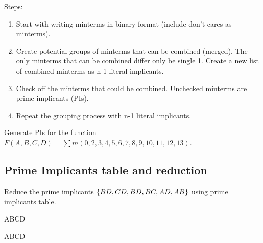 Steps:
\begin{enumerate}
  \item Start with writing minterms in binary format (include don't cares as minterms).
  \item Create potential groups of minterms that can be combined (merged). The only
    minterms that can be combined differ only be single 1. Create a new list of
    combined minterms as n-1 literal implicants.
  \item Check off the minterms that could be combined. Unchecked minterms are
    prime implicants (PIs).
  \item Repeat the grouping process with n-1 literal implicants.
\end{enumerate}

\begin{prob}
  Generate PIs for the function $ F(A, B, C, D) = \sum m(0, 2, 3, 4, 5, 6, 7, 8,
  9, 10, 11, 12, 13)$.
\end{prob}

\subsection{Prime Implicants table and reduction}

\begin{example}
  Reduce the prime implicants $\{ \bar{B} \bar{D}, C\bar{D}, BD, BC, A\bar{D}, AB \}$ using prime
  implicants table.
\end{example}
\vspace{20em}

\begin{example}
  \begin{Karnaugh}{AB}{CD}
  \end{Karnaugh}
\end{example}
\vspace{10em}

\begin{example}
  \begin{Karnaugh}{AB}{CD}
  \end{Karnaugh}
\end{example}
\vspace{10em}

